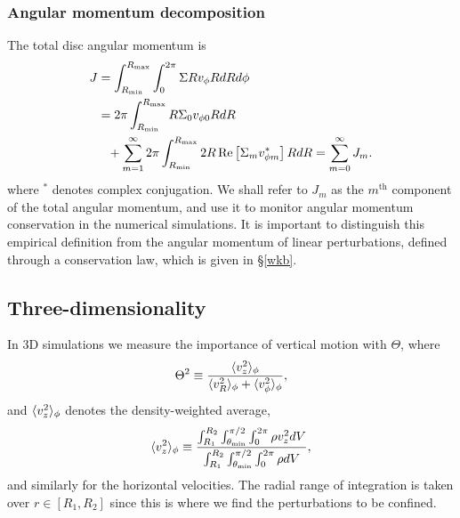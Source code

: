 \subsubsection{Angular momentum decomposition}
The total disc angular momentum is
\begin{align}
  J &= \int_{R_\mathrm{min}}^{R_\mathrm{max}}\int_0^{2\pi} \Sigma Rv_\phi RdRd\phi \notag\\
  &= 2\pi\int_{R_\mathrm{min}}^{R_\mathrm{max}} R\Sigma_0 v_{\phi0} R dR \notag\\ 
  &\phantom{=}+
  \sum_{m=1}^\infty2\pi\int_{R_\mathrm{min}}^{R_\mathrm{max}} 2R\operatorname{Re}\left[\Sigma_m v_{\phi
      m}^*\right] RdR 
  = \sum_{m=0}^\infty J_m. 
\end{align}
where $^*$ denotes complex conjugation. We shall refer to $J_m$ as the
$m^\mathrm{th}$ component of the total angular momentum, and use it to
monitor angular momentum conservation in the numerical simulations. 
It is important to distinguish this empirical definition from the
angular momentum of linear perturbations, defined through a
conservation law, which is given in \S\ref{wkb}. 


\subsection{Three-dimensionality}
In 3D simulations we measure the importance of vertical motion with
$\Theta$, where 
\begin{align}
  \Theta^2 \equiv \frac{\langle v_z^2 \rangle_\phi}{\langle v_R^2 \rangle_\phi+\langle v_\phi^2 \rangle_\phi}, 
\end{align}
and $\langle v_z^2 \rangle_\phi$ denotes the density-weighted average,
\begin{align}
  \langle v_z^2 \rangle_\phi \equiv\frac{
    \int_{R_1}^{R_2}\int_{\theta_\mathrm{min}}^{\pi/2} \int_{0}^{2\pi}
    \rho v_z^2 dV}{
    \int_{R_1}^{R_2}\int_{\theta_\mathrm{min}}^{\pi/2} \int_{0}^{2\pi}
    \rho dV
  },
\end{align}
and similarly for the horizontal velocities. The radial range of
integration is taken over $r\in[R_1,R_2]$ since this is where
we find the perturbations to be confined. 

